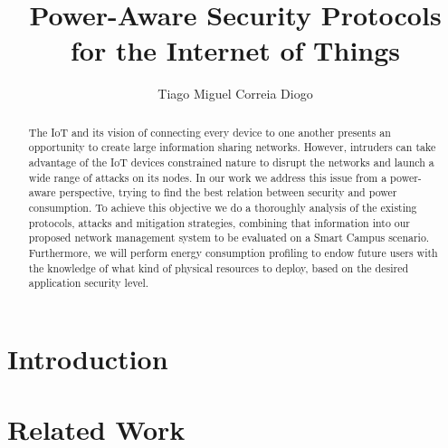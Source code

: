 \documentclass{llncs}
\begin{document}
\title{Power-Aware Security Protocols\\ for the Internet of Things}
%
\titlerunning{}  %
%
\author{Tiago Miguel Correia Diogo}
%
%
%

\maketitle              %

\begin{abstract}
The \ac{IoT} and its vision of connecting every device to one another presents an opportunity to create large information sharing networks. However, intruders can take advantage of the \ac{IoT} devices constrained nature to disrupt the networks and launch a wide range of attacks on its nodes. In our work we address this issue from a power-aware perspective, trying to find the best relation between security and power consumption. To achieve this objective we do a thoroughly analysis of the existing protocols, attacks and mitigation strategies, combining that information into our proposed network management system to be evaluated on a Smart Campus scenario. Furthermore, we will perform energy consumption profiling to endow future users with the knowledge of what kind of physical resources to deploy, based on the desired application security level.
\end{abstract}

\tableofcontents
\newpage

\section{Introduction}


\section{Related Work}
\label{sec:related_work}

\end{document}
